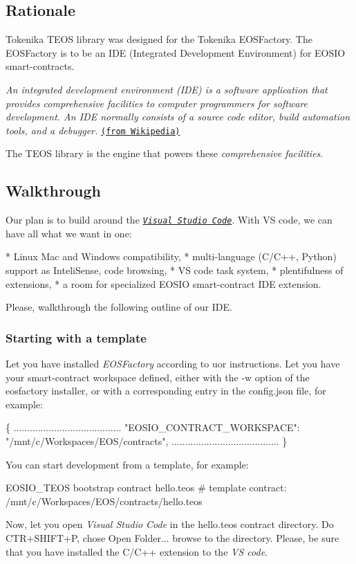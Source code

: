 \subsection*{Rationale}

Tokenika T\+E\+OS library was designed for the Tokenika E\+O\+S\+Factory. The E\+O\+S\+Factory is to be an I\+DE (Integrated Development Environment) for E\+O\+S\+IO smart-\/contracts.

{\itshape An integrated development environment (I\+DE) is a software application that provides comprehensive facilities to computer programmers for software development. An I\+DE normally consists of a source code editor, build automation tools, and a debugger.} \href{#https://en.wikipedia.org/wiki/Integrated_development_environment}{\tt (from Wikipedia)}

The T\+E\+OS library is the engine that powers these {\itshape comprehensive facilities}.

\subsection*{Walkthrough}

Our plan is to build around the \href{#https://code.visualstudio.com/}{\tt {\itshape Visual Studio Code}}. With VS code, we can have all what we want in one\+: \begin{DoxyVerb}* Linux Mac and Windows compatibility,
* multi-language (C/C++, Python) support as InteliSense, code browsing,
* VS code task system,
* plentifulness of extensions,
* a room for specialized EOSIO smart-contract IDE extension.
\end{DoxyVerb}


Please, walkthrough the following outline of our I\+DE.

\subsubsection*{Starting with a template}

Let you have installed {\itshape E\+O\+S\+Factory} according to uor instructions. Let you have your smart-\/contract workspace defined, either with the {\ttfamily -\/w} option of the {\ttfamily eosfactory} installer, or with a corresponding entry in the {\ttfamily config.\+json} file, for example\+: 
\begin{DoxyCode}
\{
........................................
    "EOSIO\_CONTRACT\_WORKSPACE": "/mnt/c/Workspaces/EOS/contracts", 
........................................
\}
\end{DoxyCode}
 You can start development from a template, for example\+: 
\begin{DoxyCode}
$ $EOSIO\_TEOS bootstrap contract hello.teos
#  template contract: /mnt/c/Workspaces/EOS/contracts/hello.teos
\end{DoxyCode}
 Now, let you open {\itshape Visual Studio Code} in the {\ttfamily hello.\+teos} contract directory. Do {\ttfamily C\+T\+R+\+S\+H\+I\+F\+T+P}, chose {\ttfamily Open Folder...} browse to the directory. Please, be sure that you have installed the {\ttfamily C/\+C++} extension to the {\itshape VS code}.

